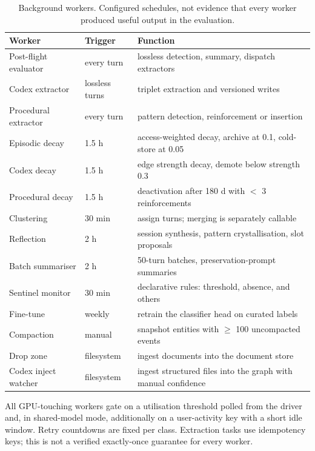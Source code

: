 \documentclass[11pt,a4paper]{article}
\begin{document}
\begin{table}[htbp]
\centering
\small
\caption{Background workers. Configured schedules, not evidence that every worker produced useful output in the evaluation.}
\label{tab:workers}
\begin{tabular}{@{}L{3.2cm}L{2.6cm}L{7.4cm}@{}}
\toprule
\textbf{Worker} & \textbf{Trigger} & \textbf{Function} \\
\midrule
Post-flight evaluator & every turn & lossless detection, summary, dispatch extractors \\
Codex extractor       & lossless turns  & triplet extraction and versioned writes \\
Procedural extractor  & every turn      & pattern detection, reinforcement or insertion \\
Episodic decay        & 1.5 h           & access-weighted decay, archive at 0.1, cold-store at 0.05 \\
Codex decay           & 1.5 h           & edge strength decay, demote below strength 0.3 \\
Procedural decay      & 1.5 h           & deactivation after 180 d with $<$ 3 reinforcements \\
Clustering            & 30 min          & assign turns; merging is separately callable \\
Reflection            & 2 h             & session synthesis, pattern crystallisation, slot proposals \\
Batch summariser      & 2 h             & 50-turn batches, preservation-prompt summaries \\
Sentinel monitor      & 30 min          & declarative rules: threshold, absence, and others \\
Fine-tune             & weekly          & retrain the classifier head on curated labels \\
Compaction            & manual          & snapshot entities with $\geq$ 100 uncompacted events \\
Drop zone             & filesystem      & ingest documents into the document store \\
Codex inject watcher  & filesystem      & ingest structured files into the graph with manual confidence \\
\bottomrule
\end{tabular}
\end{table}

All GPU-touching workers gate on a utilisation threshold polled from the driver and, in shared-model mode, additionally on a user-activity key with a short idle window. Retry countdowns are fixed per class. Extraction tasks use idempotency keys; this is not a verified exactly-once guarantee for every worker.
\end{document}
